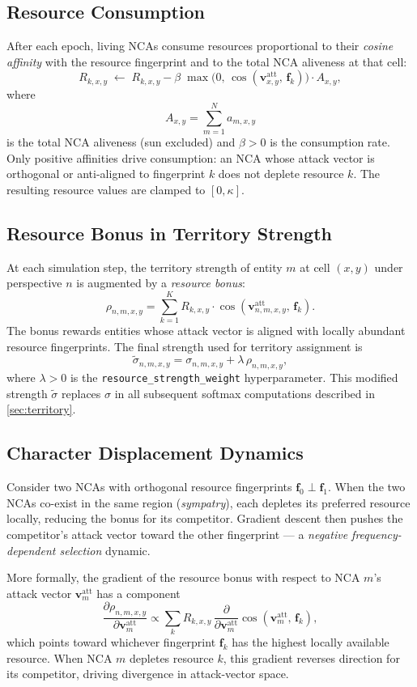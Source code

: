 \documentclass[11pt,a4paper]{article}
\newcommand{\vatt}{\mathbf{v}^{\mathrm{att}}}
\newcommand{\fvec}{\mathbf{f}}
\newcommand{\cosim}[2]{\cos\!\left(#1,\,#2\right)}
\theoremstyle{definition}
\begin{document}
\subsection{Resource Consumption}

After each epoch, living NCAs consume resources proportional to their \emph{cosine affinity} with the resource fingerprint and to the total NCA aliveness at that cell:
\[
    R_{k,x,y} \;\leftarrow\; R_{k,x,y}
    - \beta\;\max\!\bigl(0,\,\cosim{\vatt_{x,y}}{\fvec_k}\bigr)\cdot A_{x,y},
\]
where
\[
    A_{x,y} = \sum_{m=1}^{N} a_{m,x,y}
\]
is the total NCA aliveness (sun excluded) and $\beta > 0$ is the consumption rate. Only positive affinities drive consumption: an NCA whose attack vector is orthogonal or anti-aligned to fingerprint $k$ does not deplete resource $k$. The resulting resource values are clamped to $[0,\kappa]$.

\subsection{Resource Bonus in Territory Strength}

At each simulation step, the territory strength of entity $m$ at cell $(x,y)$ under perspective $n$ is augmented by a \emph{resource bonus}:
\[
    \rho_{n,m,x,y}
    = \sum_{k=1}^{K} R_{k,x,y}\cdot
    \cosim{\vatt_{n,m,x,y}}{\fvec_k}.
\]
The bonus rewards entities whose attack vector is aligned with locally abundant resource fingerprints. The final strength used for territory assignment is
\[
    \tilde{\sigma}_{n,m,x,y}
    = \sigma_{n,m,x,y} + \lambda\,\rho_{n,m,x,y},
\]
where $\lambda > 0$ is the \texttt{resource\_strength\_weight} hyperparameter. This modified strength $\tilde{\sigma}$ replaces $\sigma$ in all subsequent softmax computations described in \cref{sec:territory}.

\subsection{Character Displacement Dynamics}

Consider two NCAs with orthogonal resource fingerprints $\fvec_0 \perp \fvec_1$. When the two NCAs co-exist in the same region (\emph{sympatry}), each depletes its preferred resource locally, reducing the bonus for its competitor. Gradient descent then pushes the competitor's attack vector toward the other fingerprint — a \emph{negative frequency-dependent selection} dynamic.

More formally, the gradient of the resource bonus with respect to NCA $m$'s attack vector $\vatt_m$ has a component
\[
    \frac{\partial \rho_{n,m,x,y}}{\partial \vatt_{m}}
    \propto \sum_{k} R_{k,x,y}\,
    \frac{\partial}{\partial \vatt_m}
    \cosim{\vatt_m}{\fvec_k},
\]
which points toward whichever fingerprint $\fvec_k$ has the highest locally available resource. When NCA $m$ depletes resource $k$, this gradient reverses direction for its competitor, driving divergence in attack-vector space.
\end{document}
